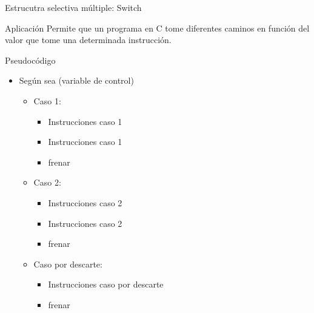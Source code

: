 \documentclass[xcolor=pdftex,table,11pt]{beamer}
\begin{document}
\begin{frame}{Estrucutra selectiva múltiple: Switch}

 \begin{block}{Aplicación}
 Permite que un programa en C tome diferentes caminos en función del valor que tome una determinada instrucción.
 
 
 \end{block}

 \begin{block}{Pseudocódigo}

    \begin{itemize}
   \item[]Según sea (variable de control)
   \begin{itemize}

     	\item[] Caso 1:
     	    \begin{itemize}
     			\item[] Instrucciones caso 1
     			\item[] Instrucciones caso 1
     			\item[] frenar
     		   \end{itemize}

        \item[] Caso 2:
     	    \begin{itemize}
     			\item[] Instrucciones caso 2
     			\item[] Instrucciones caso 2

     			\item[] frenar
 		
   			\end{itemize}
    
    \item[] Caso por descarte:
     	    \begin{itemize}
     			\item[] Instrucciones caso por descarte
     			\item[] frenar
 		
   			\end{itemize}

   \end{itemize}

	\end{itemize}

 \end{block}





\end{frame}
\end{document}
